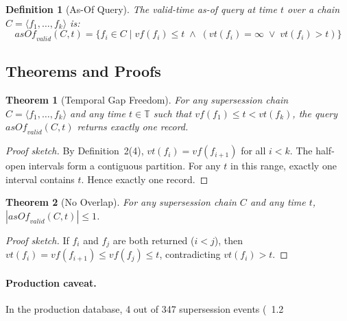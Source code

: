\documentclass{article}
\newtheorem{definition}{Definition}
\newtheorem{theorem}{Theorem}
\begin{document}
\begin{definition}[As-Of Query]
The \emph{valid-time as-of query} at time $t$ over a chain $C = \langle f_1, \ldots, f_k \rangle$ is:
\[
\mathit{asOf}_{\mathit{valid}}(C, t) = \{f_i \in C \mid \mathit{vf}(f_i) \leq t \;\wedge\; (\mathit{vt}(f_i) = \infty \;\vee\; \mathit{vt}(f_i) > t)\}
\]
\end{definition}

\subsection{Theorems and Proofs}

\begin{theorem}[Temporal Gap Freedom]
\label{thm:gapfree}
For any supersession chain $C = \langle f_1, \ldots, f_k \rangle$ and any time $t \in \mathbb{T}$ such that $\mathit{vf}(f_1) \leq t < \mathit{vt}(f_k)$, the query $\mathit{asOf}_{\mathit{valid}}(C, t)$ returns exactly one record.
\end{theorem}

\begin{proof}[Proof sketch]
By Definition~2(4), $\mathit{vt}(f_i) = \mathit{vf}(f_{i+1})$ for all $i < k$. The half-open intervals form a contiguous partition. For any $t$ in this range, exactly one interval contains $t$. Hence exactly one record.
\end{proof}

\begin{theorem}[No Overlap]
\label{thm:nooverlap}
For any supersession chain $C$ and any time $t$, $|\mathit{asOf}_{\mathit{valid}}(C, t)| \leq 1$.
\end{theorem}

\begin{proof}[Proof sketch]
If $f_i$ and $f_j$ are both returned ($i < j$), then $\mathit{vt}(f_i) = \mathit{vf}(f_{i+1}) \leq \mathit{vf}(f_j) \leq t$, contradicting $\mathit{vt}(f_i) > t$.
\end{proof}
\paragraph{Production caveat.} In the production database, 4 out of 347 supersession events (~1.2%
\end{document}

